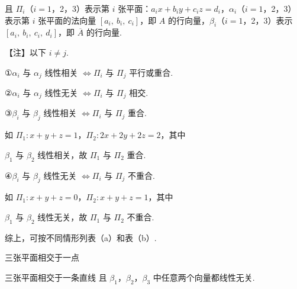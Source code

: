 且 $\Pi_i$（$i=1$，2，3）表示第 $i$ 张平面：$a_ix+b_iy+c_iz=d_i$，$\alpha_i$（$i=1$，2，3）表示第 $i$ 张平面的法向量 $[a_i,\ b_i,\ c_i]$，即 $A$ 的行向量，$\beta_i$（$i=1$，2，3）表示 $[a_i,\ b_i,\ c_i,\ d_i]$，即 $\overline{A}$ 的行向量.

\begin{fnote}
【注】以下 $i\ne j$.

①$\alpha_i$ 与 $\alpha_j$ 线性相关 $\Leftrightarrow \Pi_i$ 与 $\Pi_j$ 平行或重合.

②$\alpha_i$ 与 $\alpha_j$ 线性无关 $\Leftrightarrow \Pi_i$ 与 $\Pi_j$ 相交.

③$\beta_i$ 与 $\beta_j$ 线性相关 $\Leftrightarrow \Pi_i$ 与 $\Pi_j$ 重合.

如 $\Pi_1:x+y+z=1$，$\Pi_2:2x+2y+2z=2$，其中


$\beta_1$ 与 $\beta_2$ 线性相关，故 $\Pi_1$ 与 $\Pi_2$ 重合.

④$\beta_i$ 与 $\beta_j$ 线性无关 $\Leftrightarrow \Pi_i$ 与 $\Pi_j$ 不重合.

如 $\Pi_1:x+y+z=0$，$\Pi_2:x+y+z=1$，其中


$\beta_1$ 与 $\beta_2$ 线性无关，故 $\Pi_1$ 与 $\Pi_2$ 不重合.
\end{fnote}

综上，可按不同情形列表（a）和表（b）.



\begin{fcard}{三张平面相交于一点}
\end{fcard}

\begin{fcard}{三张平面相交于一条直线}
且 $\beta_1$，$\beta_2$，$\beta_3$ 中任意两个向量都线性无关.
\end{fcard}

